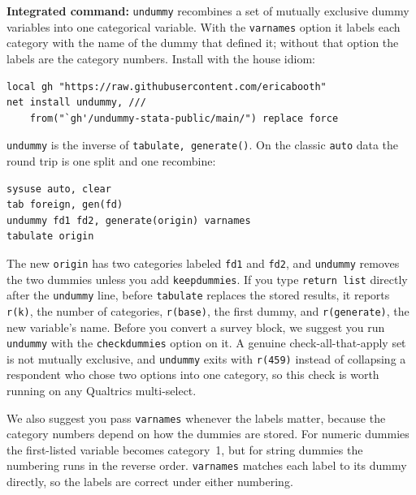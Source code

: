 \begin{kaobox}[frametitle=Package Integration: \texttt{undummy}]
\textbf{Integrated command:} \texttt{undummy} recombines a set of mutually exclusive dummy variables into one categorical variable. With the \texttt{varnames} option it labels each category with the name of the dummy that defined it; without that option the labels are the category numbers. Install with the house idiom:
\par
{\footnotesize
\begin{verbatim}
local gh "https://raw.githubusercontent.com/ericabooth"
net install undummy, ///
    from("`gh'/undummy-stata-public/main/") replace force
\end{verbatim}
}
\texttt{undummy} is the inverse of \texttt{tabulate, generate()}. On the classic \texttt{auto} data the round trip is one split and one recombine:
\par
{\footnotesize
\begin{verbatim}
sysuse auto, clear
tab foreign, gen(fd)
undummy fd1 fd2, generate(origin) varnames
tabulate origin
\end{verbatim}
}
The new \texttt{origin} has two categories labeled \texttt{fd1} and \texttt{fd2}, and \texttt{undummy} removes the two dummies unless you add \texttt{keepdummies}. If you type \texttt{return list} directly after the \texttt{undummy} line, before \texttt{tabulate} replaces the stored results, it reports \texttt{r(k)}, the number of categories, \texttt{r(base)}, the first dummy, and \texttt{r(generate)}, the new variable's name. Before you convert a survey block, we suggest you run \texttt{undummy} with the \texttt{checkdummies} option on it. A genuine check-all-that-apply set is not mutually exclusive, and \texttt{undummy} exits with \texttt{r(459)} instead of collapsing a respondent who chose two options into one category, so this check is worth running on any Qualtrics multi-select.
\end{kaobox}

We also suggest you pass \texttt{varnames} whenever the labels matter, because the category numbers depend on how the dummies are stored. For numeric dummies the first-listed variable becomes category~1, but for string dummies the numbering runs in the reverse order. \texttt{varnames} matches each label to its dummy directly, so the labels are correct under either numbering.

